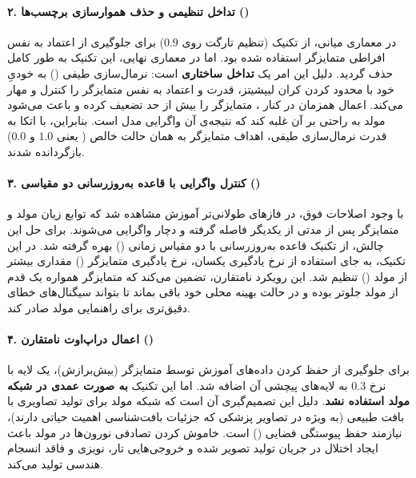 \documentclass{article}
\begin{document}
\paragraph{۲. تداخل تنظیمی و حذف هموارسازی برچسب‌ها ()}
در معماری میانی، از تکنیک  (تنظیم تارگت روی $0.9$) برای جلوگیری از اعتماد به نفس افراطی متمایزگر استفاده شده بود. اما در معماری نهایی، این تکنیک به طور کامل حذف گردید.
دلیل این امر یک \textbf{تداخل ساختاری} است: نرمال‌سازی طیفی () به خودیِ خود با محدود کردن کران لیپشیتز، قدرت و اعتماد به نفس متمایزگر را کنترل و مهار می‌کند. اعمال همزمان  در کنار ، متمایزگر را بیش از حد تضعیف کرده و باعث می‌شود مولد به راحتی بر آن غلبه کند که نتیجه‌ی آن واگرایی مدل است. بنابراین، با اتکا به قدرت نرمال‌سازی طیفی، اهداف متمایزگر به همان حالت خالص ( یعنی $1.0$ و $0.0$) بازگردانده شدند.

\paragraph{۳. کنترل واگرایی با قاعده به‌روزرسانی دو مقیاسی ()}
با وجود اصلاحات فوق، در فازهای طولانی‌تر آموزش مشاهده شد که توابع زیان مولد و متمایزگر پس از مدتی از یکدیگر فاصله گرفته و دچار واگرایی می‌شوند. برای حل این چالش، از تکنیک قاعده به‌روزرسانی با دو مقیاس زمانی () بهره گرفته شد.
در این تکنیک، به جای استفاده از نرخ یادگیری یکسان، نرخ یادگیری متمایزگر () مقداری بیشتر از مولد () تنظیم شد. این رویکرد نامتقارن، تضمین می‌کند که متمایزگر همواره یک قدم از مولد جلوتر بوده و در حالت بهینه محلی خود باقی بماند تا بتواند سیگنال‌های خطای دقیق‌تری برای راهنمایی مولد صادر کند.

\paragraph{۴. اعمال دراپ‌اوت نامتقارن ()}
برای جلوگیری از حفظ کردن داده‌های آموزش توسط متمایزگر (بیش‌برازش)، یک لایه  با نرخ $0.3$ به لایه‌های پیچشی آن اضافه شد. 
اما این تکنیک \textbf{به صورت عمدی در شبکه مولد استفاده نشد}. دلیل این تصمیم‌گیری آن است که شبکه مولد برای تولید تصاویری با بافت طبیعی (به ویژه در تصاویر پزشکی که جزئیات بافت‌شناسی اهمیت حیاتی دارند)، نیازمند حفظ پیوستگی فضایی () است. خاموش کردن تصادفی نورون‌ها در مولد باعث ایجاد اختلال در جریان تولید تصویر شده و خروجی‌هایی تار، نویزی و فاقد انسجام هندسی تولید می‌کند.
\end{document}
